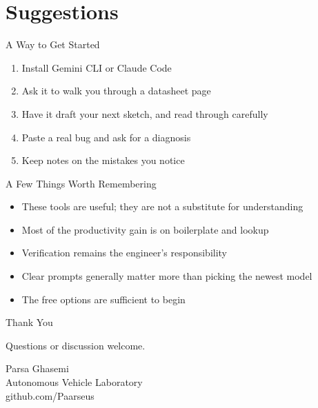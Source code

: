 \documentclass[aspectratio=169,11pt]{beamer}
\begin{document}
\section{Suggestions}

\begin{frame}{A Way to Get Started}
  \begin{enumerate}
    \setlength\itemsep{0.4em}
    \item Install Gemini CLI or Claude Code
    \item Ask it to walk you through a datasheet page
    \item Have it draft your next sketch, and read through carefully
    \item Paste a real bug and ask for a diagnosis
    \item Keep notes on the mistakes you notice
  \end{enumerate}
\end{frame}

\begin{frame}{A Few Things Worth Remembering}
  \begin{itemize}
    \setlength\itemsep{0.4em}
    \item These tools are useful; they are not a substitute for understanding
    \item Most of the productivity gain is on boilerplate and lookup
    \item Verification remains the engineer's responsibility
    \item Clear prompts generally matter more than picking the newest model
    \item The free options are sufficient to begin
  \end{itemize}
\end{frame}


\begin{frame}{Thank You}
  \vfill
  \begin{center}
    Questions or discussion welcome.
    \vspace{1.5em}

    \small Parsa Ghasemi \\
    \small Autonomous Vehicle Laboratory \\
    \small github.com/Paarseus
  \end{center}
  \vfill
\end{frame}
\end{document}
